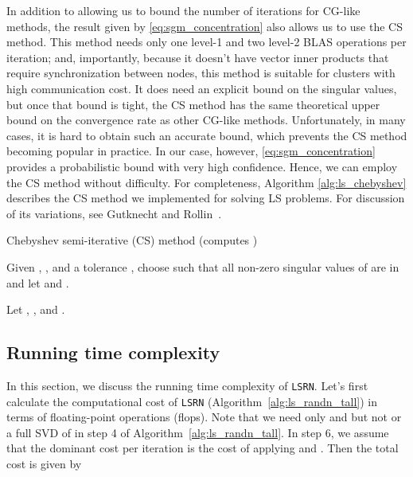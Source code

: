 \documentclass{siamltex}
\begin{document}
In addition to allowing us to bound the number of iterations for CG-like
methods, the result given by \eqref{eq:sgm_concentration} also allows us to use
the CS method.  This method needs only one level-1
and two level-2 BLAS operations per iteration; and, importantly, because it
doesn't have vector inner products that require synchronization between nodes,
this method is suitable for clusters with high communication cost. It does need
an explicit bound on the singular values, but once that bound is tight, the CS
method has the same theoretical upper bound on the convergence rate as other
CG-like methods.  Unfortunately, in many cases, it is hard to obtain such an
accurate bound, which prevents the CS method becoming popular in practice.  In
our case, however, \eqref{eq:sgm_concentration} provides a probabilistic bound
with very high confidence.  Hence, we can employ the CS method without
difficulty.  For completeness, Algorithm \ref{alg:ls_chebyshev} describes the CS
method we implemented for solving LS problems.  For discussion of its
variations, see Gutknecht and Rollin~\cite{gutknecht2002chebyshev}.
\begin{algorithm}[h]
  \caption{Chebyshev semi-iterative (CS) method (computes )}
  \label{alg:ls_chebyshev}
  \begin{algorithmic}[1]
    \STATE Given , , and a
    tolerance , choose  such that all
    non-zero singular values of  are in  and let  and .

    \STATE Let , , and .

    \FOR{} 

    \STATE  
    \quad 
    

    \STATE 

    \STATE 

    \STATE 

    \ENDFOR
  \end{algorithmic}
\end{algorithm}

\subsection{Running time complexity}
\label{subsec:complexity}

In this section, we discuss the running time complexity of \texttt{LSRN}.  Let's
first calculate the computational cost of \texttt{LSRN}
(Algorithm~\ref{alg:ls_randn_tall}) in terms of floating-point operations
(flops).  Note that we need only  and  but not
 or a full SVD of  in step 4 of
Algorithm~\ref{alg:ls_randn_tall}. In step 6, we assume that the dominant cost
per iteration is the cost of applying  and . Then the total cost is
given by
\end{document}
